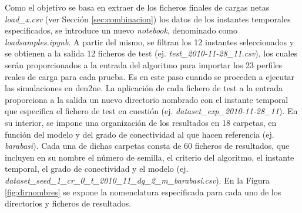 Como el objetivo se basa en extraer de los ficheros finales de cargas netas \textit{load\_x.csv} (ver Sección \ref{sec:combinacion}) los datos de los instantes temporales especificados, se introduce un nuevo \textit{notebook}, denominado como \textit{loadsamples.ipynb}. A partir del mismo, se filtran los 12 instantes seleccionados y se obtienen a la salida 12 ficheros de test (ej. \textit{test\_2010-11-28\_11.csv}), los cuales serán proporcionados a la entrada del algoritmo para importar los 23 perfiles reales de carga para cada prueba. Es en este paso cuando se proceden a ejecutar las simulaciones en \gls{den2ne}. La aplicación de cada fichero de test a la entrada proporciona a la salida un nuevo directorio nombrado con el instante temporal que especifica el fichero de test en cuestión (ej. \textit{dataset\_exp\_2010-11-28\_11}). En su interior, se impone una organización de los resultados en 18 carpetas, en función del modelo y del grado de conectividad al que hacen referencia (ej. \textit{barabasi}). Cada una de dichas carpetas consta de 60 ficheros de resultados, que incluyen en su nombre el número de semilla, el criterio del algoritmo, el instante temporal, el grado de conectividad y el modelo (ej. \textit{dataset\_seed\_1\_cr\_0\_t\_2010\_11\_dg\_2\_m\_barabasi.csv}). En la Figura \ref{fig:dirnombres} se expone la nomenclatura especificada para cada uno de los directorios y ficheros de resultados.

\vspace{3mm}

